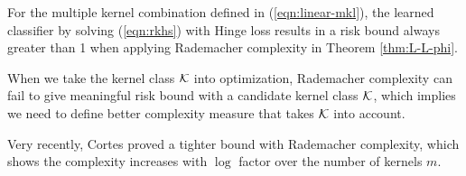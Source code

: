 \begin{theorem} \label{thm:rdm-fails}
For the multiple kernel combination defined in (\ref{eqn:linear-mkl}), the learned
classifier by solving (\ref{eqn:rkhs}) with Hinge loss results in a risk bound always
greater than 1 when applying Rademacher complexity in Theorem \ref{thm:L-L-phi}.
\end{theorem}
%


\begin{remark} \label{rmk:rdmchr-fails}
When we take the kernel class ${\cal K}$ into optimization, Rademacher complexity can fail to give meaningful risk bound with a candidate kernel
class ${\cal K}$, which implies we need to define better complexity measure
that takes ${\cal K}$ into account.
\end{remark}

Very recently, Cortes proved a tighter bound with Rademacher complexity\cite{icml/CortesMR10a}, which shows the complexity increases with $\log$ factor over the number of kernels $m$.

